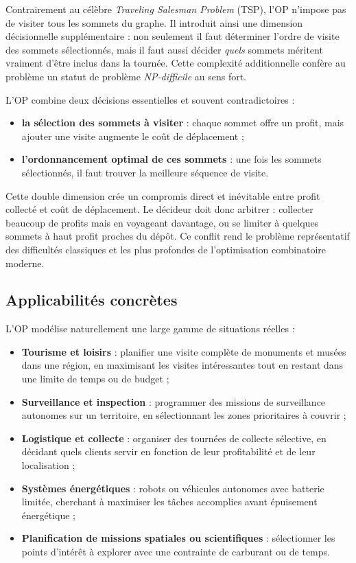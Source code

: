\documentclass[11pt,a4paper]{article}
\begin{document}
Contrairement au célèbre \emph{Traveling Salesman Problem} (TSP), l'OP n'impose pas de visiter tous les sommets du graphe. Il introduit ainsi une dimension décisionnelle supplémentaire : non seulement il faut déterminer l'ordre de visite des sommets sélectionnés, mais il faut aussi décider \emph{quels} sommets méritent vraiment d'être inclus dans la tournée. Cette complexité additionnelle confère au problème un statut de problème \emph{NP-difficile} au sens fort.

L'OP combine deux décisions essentielles et souvent contradictoires :

\begin{itemize}
    \item \textbf{la sélection des sommets à visiter} : chaque sommet offre un profit, mais ajouter une visite augmente le coût de déplacement ;
    \item \textbf{l'ordonnancement optimal de ces sommets} : une fois les sommets sélectionnés, il faut trouver la meilleure séquence de visite.
\end{itemize}

Cette double dimension crée un compromis direct et inévitable entre profit collecté et coût de déplacement. Le décideur doit donc arbitrer : collecter beaucoup de profits mais en voyageant davantage, ou se limiter à quelques sommets à haut profit proches du dépôt. Ce conflit rend le problème représentatif des difficultés classiques et les plus profondes de l'optimisation combinatoire moderne.

\subsection{Applicabilités concrètes}

L'OP modélise naturellement une large gamme de situations réelles :

\begin{itemize}
    \item \textbf{Tourisme et loisirs} : planifier une visite complète de monuments et musées dans une région, en maximisant les visites intéressantes tout en restant dans une limite de temps ou de budget ;
    \item \textbf{Surveillance et inspection} : programmer des missions de surveillance autonomes sur un territoire, en sélectionnant les zones prioritaires à couvrir ;
    \item \textbf{Logistique et collecte} : organiser des tournées de collecte sélective, en décidant quels clients servir en fonction de leur profitabilité et de leur localisation ;
    \item \textbf{Systèmes énergétiques} : robots ou véhicules autonomes avec batterie limitée, cherchant à maximiser les tâches accomplies avant épuisement énergétique ;
    \item \textbf{Planification de missions spatiales ou scientifiques} : sélectionner les points d'intérêt à explorer avec une contrainte de carburant ou de temps.
\end{itemize}
\end{document}
